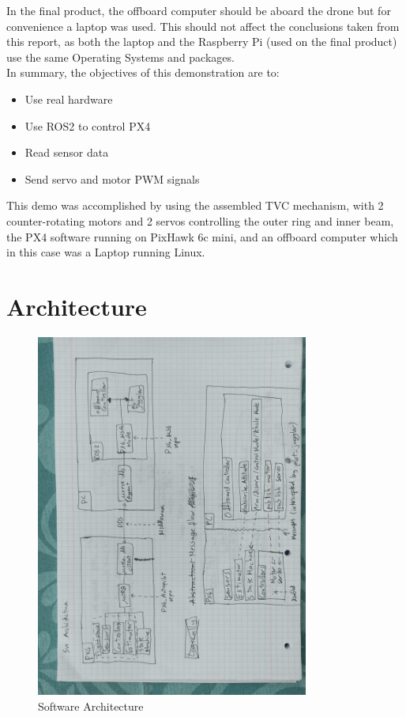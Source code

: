 \documentclass[a4paper]{article}
\begin{document}
In the final product, the offboard computer should be aboard the drone but for convenience a laptop was used. 
This should not affect the conclusions taken from this report, as both the laptop and the Raspberry Pi (used on the final product) use the same Operating Systems and packages. \\ 

In summary, the objectives of this demonstration are to: 

\begin{itemize}
    \item Use real hardware 
    \item Use ROS2 to control PX4
    \item Read sensor data 
    \item Send servo and motor PWM signals 
\end{itemize}

This demo was accomplished by using the assembled TVC mechanism, with 2 counter-rotating motors and 2 servos controlling the outer ring and inner beam, the PX4 software running on PixHawk 6c mini, and an offboard computer which in this case was a Laptop running Linux. 



\clearpage
\section{Architecture}

\begin{figure}[H]
    \centering
    \includegraphics[width=0.8\textwidth]{imgs/Software Diagram.jpg}
    \caption{Software Architecture}
    \label{fig:software_architecture}
\end{figure}
\end{document}
